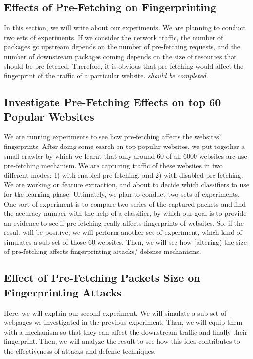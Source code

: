\subsection{Effects of Pre-Fetching on Fingerprinting}
In this section, we will write  about our experiments. We are planning to conduct two sets of experiments. If we consider the network traffic, the number of packages go upstream depends on the number of pre-fetching requests, and the number of downstream packages coming depends on the size of resources that should be pre-fetched. Therefore, it is obvious that pre-fetching would affect the fingerprint of the traffic of a particular website.  \emph{should be completed.}

\subsection{Investigate Pre-Fetching Effects on top 60 Popular Websites}
We are running experiments to see how pre-fetching affects the websites' fingerprints.
After doing some search on top popular websites, we put together a small crawler by which we learnt that only around 60 of all 6000 websites are use pre-fetching mechanism. We are capturing traffic of these websites in two different modes: 1) with enabled pre-fetching, and 2) with disabled pre-fetching. We are working on feature extraction, and about to decide which classifiers to use for the learning phase.
Ultimately, we plan to conduct two sets of experiments. One sort of experiment is to compare two series of the captured packets and find the accuracy number with the help of a classifier, by which our goal is to provide an evidence to see if pre-fetching really affects fingerprints of websites. So, if the result will be positive, we will perform another set of experiment, which kind of simulates a sub set of those 60 websites. Then, we will see how (altering) the size of pre-fetching affects fingerprinting attacks/ defense mechanisms.


\subsection{Effect of Pre-Fetching Packets Size on Fingerprinting Attacks}
Here, we will explain our second experiment. We will simulate a sub set of webpages we investigated in the previous experiment. Then, we will equip them with a mechanism so that they can affect the downstream traffic and finally their fingerprint. Then, we will analyze the result to see how this idea contributes to the effectiveness of attacks and defense techniques.


